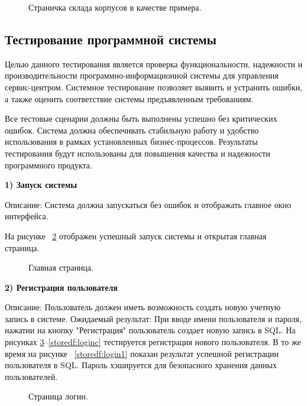 \begin{figure}[ht]
	\caption{Страничка склада корпусов в качестве примера.}
	\label{storedf:image}
\end{figure}

\subsection{Тестирование программной системы}
Целью данного тестирования является проверка функциональности, надежности и производительности программно-информационной системы для управления сервис-центром.
Системное тестирование позволяет выявить и устранить ошибки, а также оценить соответствие системы предъявленным требованиям.

Все тестовые сценарии должны быть выполнены успешно без критических ошибок. Система должна обеспечивать стабильную работу и удобство использования в рамках установленных бизнес-процессов. Результаты тестирования будут использованы для повышения качества и надежности программного продукта.

\textbf{1) Запуск системы}

Описание: Система должна запускаться без ошибок и отображать главное окно интерфейса.

На рисунке ~\ref{storedf:index0} отображен успешный запуск системы и открытая главная страница.

\begin{figure}[ht]
	\caption{Главная страница.}
	\label{storedf:index0}
\end{figure}

\textbf{2) Регистрация пользователя}

Описание: Пользователь должен иметь возможность создать новую учетную запись в системе.
Ожидаемый результат:  При вводе имени пользователя и пароля, нажатии на кнопку "Регистрация" пользователь создает новую запись в SQL. На рисунках \ref{storedf:login0}--\ref{storedf:loginc} тестируется регистрация нового пользователя. В то же время на рисунке ~\ref{storedf:login1} показан результат успешной регистрации пользователя в SQL. Пароль хэшируется для безопасного хранения данных пользователей.

\begin{figure}[ht]
	\caption{Страница логин.}
	\label{storedf:login0}
\end{figure}

